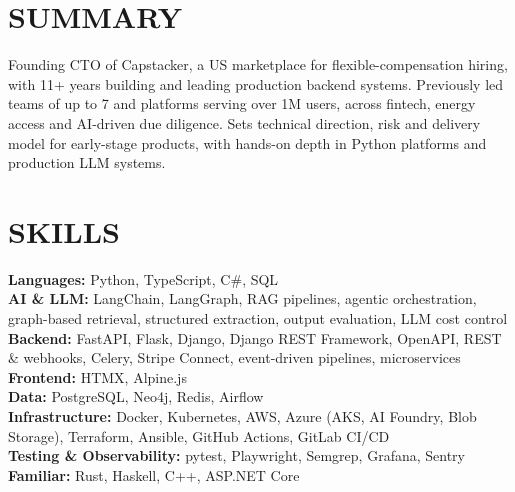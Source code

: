 \documentclass[margin, 10pt]{res} %
\begin{document}
\begin{resume}


    \section{SUMMARY}

    Founding CTO of Capstacker, a US marketplace for flexible-compensation hiring, with 11+ years building and leading production backend systems. Previously led teams of up to 7 and platforms serving over 1M users, across fintech, energy access and AI-driven due diligence. Sets technical direction, risk and delivery model for early-stage products, with hands-on depth in Python platforms and production LLM systems.


    \section{SKILLS}

    \textbf{Languages:} Python, TypeScript, C\#, SQL\\
    \textbf{AI \& LLM:} LangChain, LangGraph, RAG pipelines, agentic orchestration, graph-based retrieval, structured extraction, output evaluation, LLM cost control\\
    \textbf{Backend:} FastAPI, Flask, Django, Django REST Framework, OpenAPI, REST \& webhooks, Celery, Stripe Connect, event-driven pipelines, microservices\\
    \textbf{Frontend:} HTMX, Alpine.js\\
    \textbf{Data:} PostgreSQL, Neo4j, Redis, Airflow\\
    \textbf{Infrastructure:} Docker, Kubernetes, AWS, Azure (AKS, AI Foundry, Blob Storage), Terraform, Ansible, GitHub Actions, GitLab CI/CD\\
    \textbf{Testing \& Observability:} pytest, Playwright, Semgrep, Grafana, Sentry\\
    \textbf{Familiar:} Rust, Haskell, C++, ASP.NET Core



\end{resume}
\end{document}
